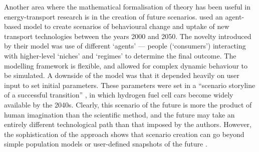 
Another area where the mathematical formalisation of theory has been useful in
energy-transport research is in the creation of future scenarios.
\citet{Kohler2009} used an agent-based model to create scenarios of behavioural
change and uptake of new transport technologies between the years 2000 and
2050. The novelty introduced by their model was use of different `agents' ---
people (`consumers') interacting with higher-level `niches' and `regimes' to
determine the final outcome. The modelling framework is flexible, and allowed
for complex dynamic behaviour to be simulated. A downside of the model was
that it depended heavily on user input to set initial parameters. These
parameters were set in a
``scenario storyline of a successful transition'' \citep[p.~2988]{Kohler2009},
in which hydrogen fuel
cell cars become widely available by the 2040s. Clearly, this scenario of the
future is more the product of human imagination than the scientific method,
and the future may take an entirely different technological path than that
imposed by the authors.
However, the sophistication of the approach shows that scenario creation
can go beyond simple population models \citep{Lovelace2011-assessing} or
user-defined snapshots of the future \citep{Akerman2006}.

